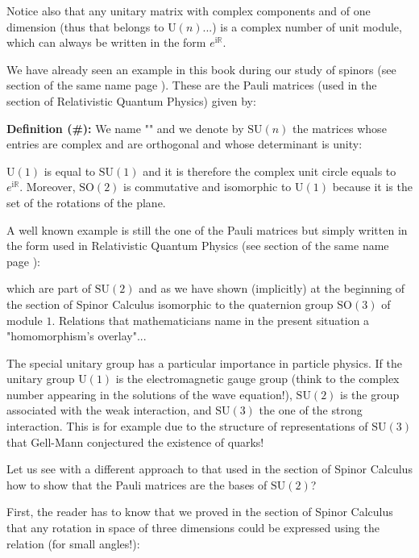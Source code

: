 	Notice also that any unitary matrix with complex components and of one dimension  (thus that belongs to $\text{U}(n)$...) is a complex number of unit module, which can always be written in the form $e^{\mathrm{i}\mathbb{R}}$.
	
	We have already seen an example in this book during our study of spinors (see section of the same name page \pageref{spinors}). These are the Pauli matrices (used in the section of Relativistic Quantum Physics) given by:
	
	\textbf{Definition (\#\mydef):} We name "\label{special unitary group}" and we denote by $\text{SU} (n)$ the matrices whose entries are complex and are orthogonal and whose determinant is unity:
	
	\begin{tcolorbox}[title=Remark,colframe=black,arc=10pt]
	$\text{U}(1)$ is equal to $\text{SU}(1)$ and it is therefore the complex unit circle equals to $e^{\mathrm{i}\mathbb{R}}$. Moreover, $\text{SO}(2)$ is commutative and isomorphic to $\text{U}(1)$ because it is the set of the rotations of the plane.
	\end{tcolorbox}
	A well known example is still the one of the Pauli matrices but simply written in the form used in Relativistic Quantum Physics (see section of the same name page \pageref{pauli matrices}):
	
	which are part of $\text{SU}(2)$ and as we have shown (implicitly) at the beginning of the section of Spinor Calculus isomorphic to the quaternion group $\text{SO}(3)$ of module $1$. Relations that mathematicians name in the present situation a "homomorphism's overlay"...
	\begin{tcolorbox}[title=Remark,colframe=black,arc=10pt]
	The special unitary group has a particular importance in particle physics. If the unitary group $\text{U} (1)$ is the electromagnetic gauge group (think to the complex number appearing in the solutions of the wave equation!), $\text{SU} (2)$ is the group associated with the weak interaction, and $\text{SU} (3)$ the one of the strong interaction. This is for example due to the structure of representations of $\text{SU} (3)$ that Gell-Mann conjectured the existence of quarks!
	\end{tcolorbox}
	Let us see with a different approach to that used in the section of Spinor Calculus how to show that the Pauli matrices are the bases of $\text{SU} (2)$?
	
	First, the reader has to know that we proved in the section of Spinor Calculus  that any rotation in space of three dimensions could be expressed using the relation (for small angles!):
	
